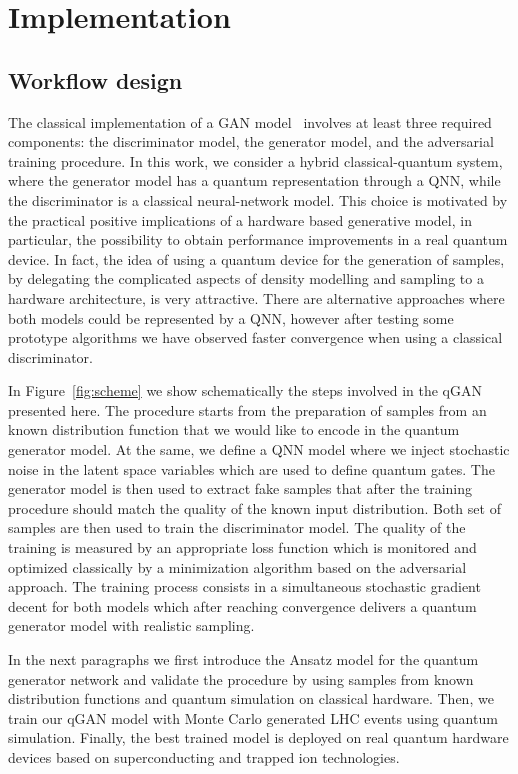 \documentclass[twocolumn,preprintnumbers,superscriptaddress]{revtex4-2}
\begin{document}
\section{Implementation}
\label{sec:implementation}

\subsection{Workflow design}

The classical implementation of a GAN model~\cite{goodfellow2014generative}
involves at least three required components: the discriminator model, the
generator model, and the adversarial training procedure. In this work, we
consider a hybrid classical-quantum system, where the generator model has a
quantum representation through a QNN, while the
discriminator is a classical neural-network model. This choice is motivated by
the practical positive implications of a hardware based generative model, in
particular, the possibility to obtain performance improvements in a real quantum
device. In fact, the idea of using a quantum device for the generation of
samples, by delegating the complicated aspects of density modelling and sampling
to a hardware architecture, is very attractive.
%
There are alternative approaches where both models could be represented by a
QNN, however after testing some prototype algorithms we
have observed faster convergence when using a classical discriminator.

In Figure~\ref{fig:scheme} we show schematically the steps involved in the qGAN
presented here. The procedure starts from the preparation of samples from an
known distribution function that we would like to encode in the quantum
generator model. At the same, we define a QNN model where
we inject stochastic noise in the latent space variables which are used to
define quantum gates. The generator model is then used to extract fake samples
that after the training procedure should match the quality of the known input
distribution. Both set of samples are then used to train the discriminator
model. The quality of the training is measured by an appropriate loss function
which is monitored and optimized classically by a minimization algorithm based on
the adversarial approach. The training process consists in a simultaneous
stochastic gradient decent for both models which after reaching convergence
delivers a quantum generator model with realistic sampling.

In the next paragraphs we first introduce the Ansatz model for the quantum
generator network and validate the procedure by using samples from known
distribution functions and quantum simulation on classical hardware. Then, we
train our qGAN model with Monte Carlo generated LHC events using quantum
simulation. Finally, the best trained model is deployed on real quantum hardware
devices based on superconducting and trapped ion technologies.
\end{document}
